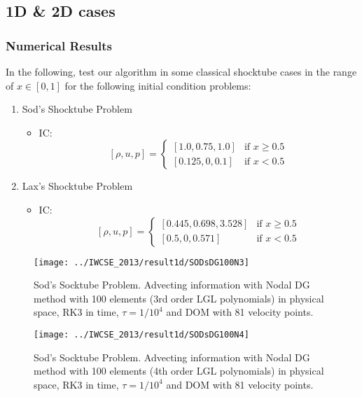 \subsection{1D \& 2D cases}
\begin{frame} \frametitle{Numerical Results}
	In the following, test our algorithm in some classical shocktube cases in the range of $x \in [0,1]$ for the following initial condition problems:
	\begin{enumerate}
	\item Sod's Shocktube Problem
		\begin{itemize}
		\item IC: 
		\[
		[\rho,u,p] =
		\begin{cases}
		[1.0,0.75,1.0] & \text{if } x \geq 0.5 \\
		[0.125,0,0.1] & \text{if } x < 0.5
		\end{cases}
		\]
		\end{itemize}
	\item Lax's Shocktube Problem
	\begin{itemize}
		\item IC: 
		\[
		[\rho,u,p] =
		\begin{cases}
		[0.445,0.698,3.528] & \text{if } x \geq 0.5 \\
		[0.5,0,0.571] & \text{if } x < 0.5
		\end{cases}
		\]
		\end{itemize}
	\end{enumerate}
\end{frame}

\begin{frame}
		\begin{figure}
			\centering
				\texttt{[image: ../IWCSE\_2013/result1d/SODsDG100N3]}
			\caption{Sod's  Socktube Problem. Advecting information with Nodal DG method with 100 elements (3rd order LGL polynomials) in physical space, RK3 in time, $\tau = 1/10^4$ and DOM with 81 velocity points.}
			\label{fig:SODsDG100N3}
		\end{figure}
\end{frame}

\begin{frame}
		\begin{figure}
			\centering
				\texttt{[image: ../IWCSE\_2013/result1d/SODsDG100N4]}
			\caption{Sod's  Socktube Problem. Advecting information with Nodal DG method with 100 elements (4th order LGL polynomials) in physical space, RK3 in time, $\tau = 1/10^4$ and DOM with 81 velocity points.}
			\label{fig:SODsDG100N4}
		\end{figure}
\end{frame}


